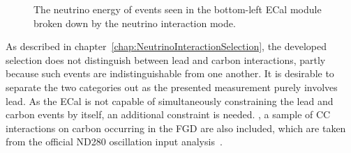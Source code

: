 \begin{figure}%
  \centering
  \caption{The neutrino energy of events seen in the bottom-left ECal module broken down by the neutrino interaction mode.  }
  \label{fig:NuEnergyReactionCodeBottomLeft}
\end{figure}
\newline
\newline
As described in chapter~\ref{chap:NeutrinoInteractionSelection}, the developed selection does not distinguish between lead and carbon interactions, partly because such events are indistinguishable from one another.  It is desirable to separate the two categories out as the presented measurement purely involves lead.  As the ECal is not capable of simultaneously constraining the lead and carbon events by itself, an additional constraint is needed.  , a sample of CC interactions on carbon occurring in the FGD are also included, which are taken from the official ND280 oscillation input analysis~\cite{CCIncSelFGDTN}.
